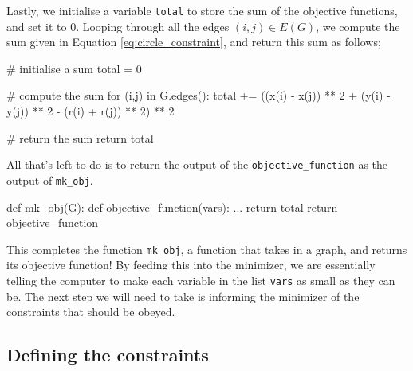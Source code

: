 \begin{flushleft}
Lastly, we initialise a variable \texttt{total} to store the sum of the objective functions, and set it to 0. Looping through all the edges $(i,j) \in E(G)$, we compute the sum given in Equation \ref{eq:circle_constraint}, and return this sum as follows;
\end{flushleft}

\begin{code}
    # initialise a sum
    total = 0
    
    # compute the sum 
    for (i,j) in G.edges():
        total += ((x(i) - x(j)) ** 2 + (y(i) - y(j)) ** 2 - (r(i) + r(j)) ** 2) ** 2
    
    # return the sum
    return total
\end{code}

\begin{flushleft}
All that's left to do is to return the output of the \texttt{objective\_function} as the output of \texttt{mk\_obj}.
\end{flushleft}

\begin{code}
    def mk_obj(G):
        def objective_function(vars):
            ...
            return total
        return objective_function
\end{code}

\begin{flushleft}
This completes the function \texttt{mk\_obj}, a function that takes in a graph, and returns its objective function! By feeding this into the minimizer, we are essentially telling the computer to make each variable in the list \texttt{vars} as small as they can be. The next step we will need to take is informing the minimizer of the constraints that should be obeyed.
\end{flushleft}

\subsection{Defining the constraints}


